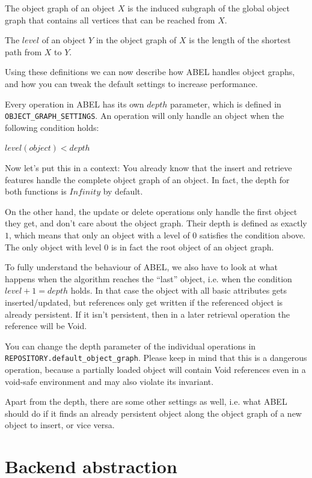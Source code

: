 The object graph of an object $X$ is the induced subgraph of the global object graph that contains all vertices that can be reached from $X$.

The $level$ of an object $Y$ in the object graph of $X$ is the length of the shortest path from $X$ to $Y$.

Using these definitions we can now describe how ABEL handles object graphs, and how you can tweak the default settings to increase performance.

Every operation in ABEL has its own $depth$ parameter, which is defined in \lstinline!OBJECT_GRAPH_SETTINGS!.
An operation will only handle an object when the following condition holds:

\begin{center}
 $ level(object) < depth $ 
\end{center}

Now let's put this in a context:
You already know that the insert and retrieve features handle the complete object graph of an object. 
In fact, the depth for both functions is $Infinity$ by default.

On the other hand, the update or delete operations only handle the first object they get, and don't care about the object graph.
Their depth is defined as exactly $1$, which means that only an object with a level of $0$ satisfies the condition above.
The only object with level $0$ is in fact the root object of an object graph.

To fully understand the behaviour of ABEL, we also have to look at what happens when the algorithm reaches the ``last'' object, i.e. when the condition $level + 1 = depth$ holds.
In that case the object with all basic attributes gets inserted/updated, but references only get written if the referenced object is already persistent.
If it isn't persistent, then in a later retrieval operation the reference will be Void.

You can change the depth parameter of the individual operations in \lstinline!REPOSITORY.default_object_graph!. 
Please keep in mind that this is a dangerous operation, because a partially loaded object will contain Void references even in a void-safe environment and may also violate its invariant.

Apart from the depth, there are some other settings as well, i.e. what ABEL should do if it finds an already persistent object along the object graph of a new object to insert, or vice versa.

\section{Backend abstraction}

